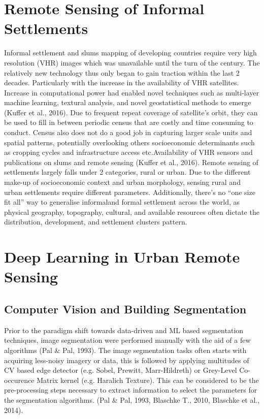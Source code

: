 \documentclass[11pt, a4paper, twoside]{report}
\begin{document}
\section{Remote Sensing of Informal Settlements}\label{RSofInformalSettlement}
Informal settlement and slums mapping of developing countries require very high resolution (VHR) images which was unavailable until the turn of the century. The relatively new technology thus only began to gain traction within the last 2 decades. Particularly with the increase in the availability of VHR satellites. Increase in computational power had enabled novel techniques such as multi-layer machine learning, textural analysis, and novel geostatistical methods to emerge (Kuffer et al., 2016). Due to frequent repeat coverage of satellite’s orbit, they can be used to fill in between periodic census that are costly and time consuming to conduct. Census also does not do a good job in capturing larger scale units and spatial patterns, potentially overlooking others socioeconomic determinants such as cropping cycles and infrastructure access etc.Availability of VHR sensors and publications on slums and remote sensing (Kuffer et al., 2016). Remote sensing of settlements largely falls under 2 categories, rural or urban. Due to the different make-up of socioeconomic context and urban morphology, sensing rural and urban settlements require different parameters. Additionally, there’s no “one size fit all” way to generalise informaland formal settlement across the world, as physical geography, topography, cultural, and available resources often dictate the distribution, development, and settlement clusters pattern.

\section{Deep Learning in Urban Remote Sensing}\label{DLinRS}

\subsection{Computer Vision and Building Segmentation}\label{CVinBS}

Prior to the paradigm shift towards data-driven and ML based segmentation techniques, image segmentation were performed manually with the aid of a few algorithms (Pal \& Pal, 1993). The image segmentation tasks often starts with acquiring less-noisy imagery or data, this is followed by applying multitudes of CV based edge detector (e.g. Sobel, Prewitt, Marr-Hildreth) or Grey-Level Co-occurence Matrix kernel (e.g. Haralich Texture). This can be considered to be the pre-processing steps necessary to extract information to select the parameters for the segmentation algorithms. (Pal \& Pal, 1993, Blaschke T., 2010, Blaschke et al., 2014).
\end{document}
